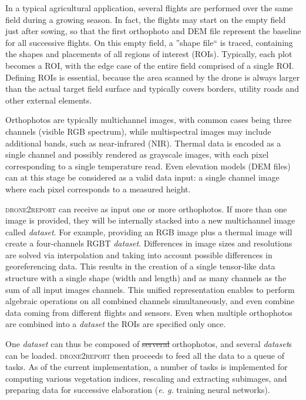 \documentclass[drones,technicalnote,accept,pdftex,moreauthors]{Definitions/mdpi}
\providecommand{\DIFadd}[1]{{\protect\color{blue}\uwave{#1}}} %
\providecommand{\DIFdel}[1]{{\protect\color{red}\sout{#1}}}                      %
\providecommand{\DIFaddbegin}{} %
\providecommand{\DIFaddend}{} %
\providecommand{\DIFdelbegin}{} %
\providecommand{\DIFdelend}{} %
\newcommand{\DIFscaledelfig}{0.5}
\newlength{\DIFdelgraphicswidth} %
\newlength{\DIFdelgraphicsheight} %
\newcommand{\DIFaddincludegraphics}[2][]{{\color{blue}\fbox{\DIFOincludegraphics[#1]{#2}}}} %
\newcommand{\DIFdelincludegraphics}[2][]{%
\sbox{\DIFdelgraphicsbox}{\DIFOincludegraphics[#1]{#2}}%
\settoboxwidth{\DIFdelgraphicswidth}{\DIFdelgraphicsbox} %
\settoboxtotalheight{\DIFdelgraphicsheight}{\DIFdelgraphicsbox} %
\scalebox{\DIFscaledelfig}{%
\parbox[b]{\DIFdelgraphicswidth}{\usebox{\DIFdelgraphicsbox}\\[-\baselineskip] \rule{\DIFdelgraphicswidth}{0em}}\llap{\resizebox{\DIFdelgraphicswidth}{\DIFdelgraphicsheight}{%
\setlength{\unitlength}{\DIFdelgraphicswidth}%
\begin{picture}(1,1)%
\thicklines\linethickness{2pt} %
{\color[rgb]{1,0,0}\put(0,0){\framebox(1,1){}}}%
{\color[rgb]{1,0,0}\put(0,0){\line( 1,1){1}}}%
{\color[rgb]{1,0,0}\put(0,1){\line(1,-1){1}}}%
\end{picture}%
}\hspace*{3pt}}} %
} %
\DeclareRobustCommand{\DIFaddbegin}{\DIFOaddbegin \let\includegraphics\DIFaddincludegraphics} %
\DeclareRobustCommand{\DIFaddend}{\DIFOaddend \let\includegraphics\DIFOincludegraphics} %
\DeclareRobustCommand{\DIFdelbegin}{\DIFOdelbegin \let\includegraphics\DIFdelincludegraphics} %
\DeclareRobustCommand{\DIFdelend}{\DIFOaddend \let\includegraphics\DIFOincludegraphics} %
\begin{document}
In a typical agricultural application, several flights are performed over the same field during a growing season. In fact, the flights may start on the empty field just after sowing, so that the first orthophoto and DEM file represent the baseline for all successive flights. On this empty field, a ''shape file`` is traced, containing the shapes and placements of all regions of interest (ROIs). Typically, each plot becomes a ROI, with the edge case of the entire field comprised of a single ROI. Defining ROIs is essential, because the area scanned by the drone is always larger than the actual target field surface and typically covers borders, utility roads and other external elements.

Orthophotos are typically multichannel images, with common cases being three channels (visible RGB spectrum), while multispectral images may include additional bands, such as near-infrared (NIR). Thermal data is encoded as a single channel and possibly rendered as grayscale images, with each pixel corresponding to a single temperature read. Even elevation models (DEM files) can at this stage be considered as a valid data input: a single channel image where each pixel corresponds to a measured height.

\textsc{drone2report} can receive as input one or more orthophotos. If more than one image is provided, they will be internally stacked into a new multichannel image called \textit{dataset}. For example, providing an RGB image plus a thermal image will create a four-channels RGBT \textit{dataset}. Differences in image sizes and resolutions are solved via interpolation and taking into account possible differences in georeferencing data. This results in the creation of a single tensor-like data structure with a single shape (width and length) and as many channels as the sum of all input images channels. This unified representation enables to perform algebraic operations on all combined channels simultaneously, and even combine data coming from different flights and sensors. Even when multiple orthophotos are combined into a \textit{dataset} the ROIs are specified only once.

One \textit{dataset} can thus be composed of \DIFdelbegin \DIFdel{serveral }\DIFdelend \DIFaddbegin \DIFadd{several }\DIFaddend orthophotos, and several \textit{dataset}s can be loaded. \textsc{drone2report} then proceeds to feed all the data to a queue of tasks. As of the current implementation, a number of tasks is implemented for computing various vegetation indices, rescaling and extracting subimages, and preparing data for successive elaboration (\textit{e. g.} training neural networks). 
\end{document}
